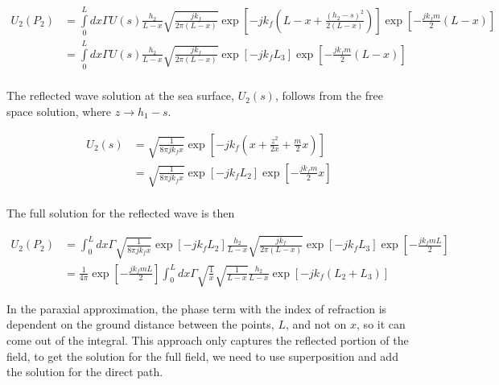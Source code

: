 \begin{equation}
\begin{aligned}
U_2(P_2) &= \int\limits_{0}^{L}dx\Gamma U(s)\frac{h_2}{L-x}\sqrt{\frac{jk_f}{2\pi (L-x)}}\exp\left[-jk_f\left(L-x +\frac{(h_2-s)^2}{2(L-x)} \right) \right]\exp\left[-\frac{jk_fm}{2}(L-x)\right] \\
&= \int\limits_{0}^{L}dx\Gamma U(s)\frac{h_2}{L-x}\sqrt{\frac{jk_f}{2\pi (L-x)}}\exp\left[-jk_fL_3\right]\exp\left[-\frac{jk_fm}{2}(L-x)\right] \\
\end{aligned}
\label{gf_eq:56}
\end{equation}
\renewcommand{\baselinestretch}{2} \small\normalsize

The reflected wave solution at the sea surface, $U_2(s)$, follows from the free space solution, where $z \rightarrow h_1-s$.

\begin{equation}
\begin{aligned}
U_2(s) &= \sqrt{\frac{1}{8\pi jk_fx}}\exp\left[-jk_f\left(x+\frac{z^2}{2x} + \frac{m}{2}x\right)\right] \\
&=\sqrt{\frac{1}{8\pi jk_fx}}\exp\left[-jk_fL_2\right]\exp\left[-\frac{jk_fm}{2}x\right] \\
\end{aligned}
\label{gf_eq:57}
\end{equation}
\renewcommand{\baselinestretch}{2} \small\normalsize

\noindent The full solution for the reflected wave is then 

\begin{equation}
\begin{aligned}
U_2(P_2) &= \int_0^L dx \Gamma \sqrt{\frac{1}{8\pi j k_f x}}\exp[-jk_fL_2]\frac{h_2}{L-x}\sqrt{\frac{jk_f}{2\pi(L-x)}}\exp[-jk_fL_3]\exp\left[-\frac{jk_fmL}{2}\right]\\
&= \frac{1}{4\pi}\exp\left[-\frac{jk_fmL}{2}\right]\int_0^L dx \Gamma \sqrt{\frac{1}{x}}\sqrt{\frac{1}{L-x}}\frac{h_2}{L-x}\exp\left[-jk_f\left(L_2+L_3\right) \right]
\label{gf_eq:58}
\end{aligned}
\end{equation}
\renewcommand{\baselinestretch}{2} \small\normalsize

In the paraxial approximation, the phase term with the index of refraction is dependent on the ground distance between the points, $L$, and not on $x$, so it can come out of the integral. This approach only captures the reflected portion of the field, to get the solution for the full field, we need to use superposition and add the solution for the direct path.

